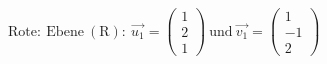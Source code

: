 \documentclass[preview]{standalone}
\begin{document}
\begin{center}
$\mathrm{Rote :\ Ebene \: (R):} \: \vec{u_1} = \begin{pmatrix} 1 \\ 2 \\ 1 \end{pmatrix} \: \mathrm{und} \: \vec{v_1} = \begin{pmatrix} 1 \\ -1 \\ 2 \end{pmatrix}$
\end{center}
\end{document}
